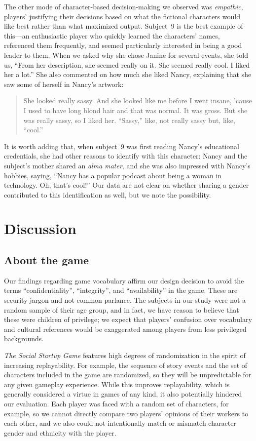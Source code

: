 \documentclass[letterpaper]{article}
\begin{document}
The other mode of character-based decision-making we
observed was \textit{empathic},
players' justifying their decisions based on what the
fictional characters would like best rather than what maximized output.
Subject~9 is the best example of this---an enthusiastic player
who quickly learned the characters' names, referenced them frequently,
and seemed particularly interested in being a good leader to them.
When we asked why she chose Janine for several events, she told us, 
``From her description, she seemed really on it. She seemed really cool.
I liked her a lot.'' 
She also commented on how much she liked Nancy, explaining that
she saw some of herself in Nancy's artwork:
\begin{quote}
She looked really sassy. And she looked like me before
I went insane, 'cause I used to have long blond hair and that was
normal. It was gross. But she was really sassy, so I liked her.
``Sassy,'' like, not really sassy but, like, ``cool.''
\end{quote}
It is worth adding that, when subject~9 was first reading Nancy's 
educational credentials, she had other reasons to identify with
this character: Nancy and the subject's mother shared an \textit{alma mater},
and she was also impressed with Nancy's hobbies, saying, ``Nancy has a popular podcast about being a woman in technology. Oh, that's cool!'' 
Our data are not clear on whether sharing a gender contributed to this
identification as well, but we note the possibility.


\section{Discussion}
\label{sec:discussion}

\subsection{About the game}

Our findings regarding game vocabulary affirm our design decision
to avoid the terms ``confidentiality'', ``integrity'', and ``availability''
in the game. These are security jargon and not common parlance.
The subjects in our study were not a random sample of their age group,
and in fact, we have reason to believe that these were children of
privilege; we expect that players' confusion over vocabulary
and cultural references would be exaggerated among players from
less privileged backgrounds.

\textit{The Social Startup Game} features high degrees of randomization
in the spirit of increasing replayability. For example, the sequence
of story events and the set of characters included in the game are randomized,
so they will be unpredictable for any given gameplay experience.
While this improves replayability, which is generally
considered a virtue in games of any kind, it also potentially hindered
our evaluation. Each player was faced with a random set of characters,
for example, so we cannot directly compare two players' opinions of their
workers to each other, and we also could not intentionally match
or mismatch character gender and ethnicity with the player.
\end{document}
